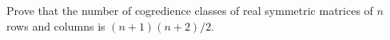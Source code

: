 Prove that the number of cogredience classes of real symmetric matrices of $n$ rows and columns is $(n + 1)(n + 2)/2$.
